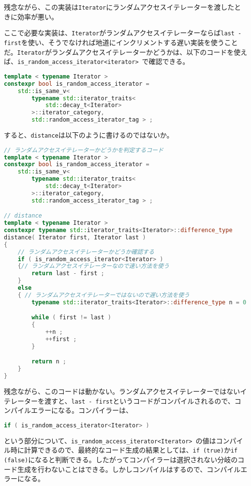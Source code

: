 残念ながら、この実装は\lstinline!Iterator!にランダムアクセスイテレーターを渡したときに効率が悪い。

ここで必要な実装は、\lstinline!Iterator!がランダムアクセスイテレーターならば\lstinline!last - first!を使い、そうでなければ地道にインクリメントする遅い実装を使うことだ。\lstinline!Iterator!がランダムアクセスイテレーターかどうかは、以下のコードを使えば、\lstinline!is_random_access_iterator<iterator>!~で確認できる。

\begin{lstlisting}[language=C++]
template < typename Iterator >
constexpr bool is_random_access_iterator =
    std::is_same_v<
        typename std::iterator_traits< 
            std::decay_t<Iterator> 
        >::iterator_category,
        std::random_access_iterator_tag > ;
\end{lstlisting}

すると、\lstinline!distance!は以下のように書けるのではないか。

\begin{lstlisting}[language=C++]
// ランダムアクセスイテレーターかどうかを判定するコード
template < typename Iterator >
constexpr bool is_random_access_iterator =
    std::is_same_v<
        typename std::iterator_traits< 
            std::decay_t<Iterator>
        >::iterator_category,
        std::random_access_iterator_tag > ;

// distance
template < typename Iterator >
constexpr typename std::iterator_traits<Iterator>::difference_type
distance( Iterator first, Iterator last )
{
    // ランダムアクセスイテレーターかどうか確認する
    if ( is_random_access_iterator<Iterator> )
    {// ランダムアクセスイテレーターなので速い方法を使う
        return last - first ;
    }
    else
    { // ランダムアクセスイテレーターではないので遅い方法を使う
        typename std::iterator_traits<Iterator>::difference_type n = 0 ;

        while ( first != last )
        {
            ++n ;
            ++first ;
        }

        return n ;
    }
}
\end{lstlisting}

残念ながら、このコードは動かない。ランダムアクセスイテレーターではないイテレーターを渡すと、\lstinline!last - first!というコードがコンパイルされるので、コンパイルエラーになる。コンパイラーは、
\begin{lstlisting}[language=C++]
if ( is_random_access_iterator<Iterator> )
\end{lstlisting}
という部分について、\lstinline!is_random_access_iterator<Iterator>!\ の値はコンパイル時に計算できるので、最終的なコード生成の結果としては、\lstinline!if (true)!か\lstinline!if (false)!になると判断できる。したがってコンパイラーは選択されない分岐のコード生成を行わないことはできる。しかしコンパイルはするので、コンパイルエラーになる。

